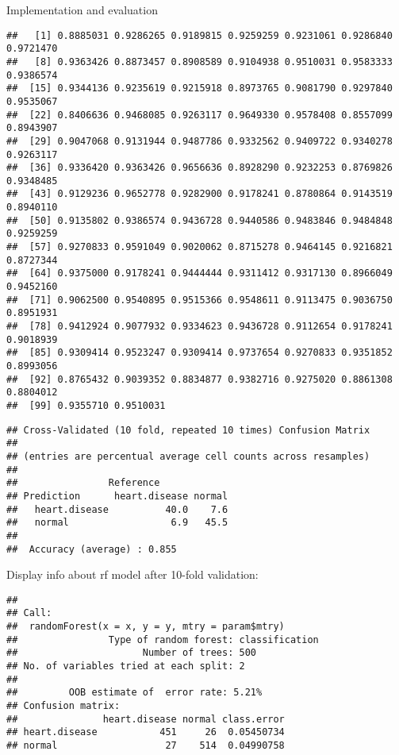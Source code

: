 \documentclass[
  ignorenonframetext,
]{beamer}
\begin{document}
\begin{frame}[fragile]{Implementation and evaluation}
\begin{verbatim}
##   [1] 0.8885031 0.9286265 0.9189815 0.9259259 0.9231061 0.9286840 0.9721470
##   [8] 0.9363426 0.8873457 0.8908589 0.9104938 0.9510031 0.9583333 0.9386574
##  [15] 0.9344136 0.9235619 0.9215918 0.8973765 0.9081790 0.9297840 0.9535067
##  [22] 0.8406636 0.9468085 0.9263117 0.9649330 0.9578408 0.8557099 0.8943907
##  [29] 0.9047068 0.9131944 0.9487786 0.9332562 0.9409722 0.9340278 0.9263117
##  [36] 0.9336420 0.9363426 0.9656636 0.8928290 0.9232253 0.8769826 0.9348485
##  [43] 0.9129236 0.9652778 0.9282900 0.9178241 0.8780864 0.9143519 0.8940110
##  [50] 0.9135802 0.9386574 0.9436728 0.9440586 0.9483846 0.9484848 0.9259259
##  [57] 0.9270833 0.9591049 0.9020062 0.8715278 0.9464145 0.9216821 0.8727344
##  [64] 0.9375000 0.9178241 0.9444444 0.9311412 0.9317130 0.8966049 0.9452160
##  [71] 0.9062500 0.9540895 0.9515366 0.9548611 0.9113475 0.9036750 0.8951931
##  [78] 0.9412924 0.9077932 0.9334623 0.9436728 0.9112654 0.9178241 0.9018939
##  [85] 0.9309414 0.9523247 0.9309414 0.9737654 0.9270833 0.9351852 0.8993056
##  [92] 0.8765432 0.9039352 0.8834877 0.9382716 0.9275020 0.8861308 0.8804012
##  [99] 0.9355710 0.9510031
\end{verbatim}

\begin{verbatim}
## Cross-Validated (10 fold, repeated 10 times) Confusion Matrix 
## 
## (entries are percentual average cell counts across resamples)
##  
##                Reference
## Prediction      heart.disease normal
##   heart.disease          40.0    7.6
##   normal                  6.9   45.5
##                            
##  Accuracy (average) : 0.855
\end{verbatim}

Display info about rf model after 10-fold validation:

\begin{verbatim}
## 
## Call:
##  randomForest(x = x, y = y, mtry = param$mtry) 
##                Type of random forest: classification
##                      Number of trees: 500
## No. of variables tried at each split: 2
## 
##         OOB estimate of  error rate: 5.21%
## Confusion matrix:
##               heart.disease normal class.error
## heart.disease           451     26  0.05450734
## normal                   27    514  0.04990758
\end{verbatim}


\end{frame}
\end{document}
